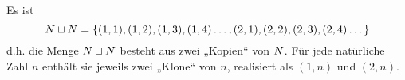 \begin{bsp}
    Es ist
        \[\relax N \sqcup\relax N=\{(1,1),(1,2),(1,3),(1,4)\dots,(2,1),(2,2),(2,3),(2,4)\dots\} \]
    d.h. die Menge $\relax N\sqcup \relax N$ besteht aus zwei „Kopien“ von $\relax N$. Für jede natürliche Zahl $n$ enthält sie jeweils zwei „Klone“ von $n$, realisiert als $(1,n)$ und $(2,n)$.
    \begin{comment}
    \begin{figure}[ht]
    \begin{tikzpicture}
        \begin{scope}[xshift=-5cm,scale=1.5]
            \draw[step=.5cm,style=help lines] (-1,-.1) grid (1.3,.1);
            \draw[->,thick] (-1,0) -- (1.5,0) node[right] {$\N$};
            \foreach \x in {1,2,3,4,5}
            \draw[xshift=.5*\x cm] (-1.5,-.1) node[below] {\x};
        \end{scope}
        \begin{scope}[scale=1.5, xshift= 0.4cm]
            \draw[style=help lines,step=.5 cm] (-1.3,-.1) grid (1.3,1.3);
            \begin{scope}
                \draw[->, thick] (-1.3,0) -- (1.5,0) node[right] {$\N$};
                \draw[thick] (-1.2,-.1) -- (-1.2,1.4) node[above] {$\{1,2\}$} coordinate(y axis);
                \foreach \x in {1,2,3,4,5}
                \draw[xshift=.5*\x cm] (-1.5,-.1) node[below] {\x};
                \foreach \y in {1,2}
                \draw[yshift=.5*\y cm] (-1.3,0) node[left] {\y};
            \end{scope}
        \end{scope}
        \begin{scope}[scale=1.5,xshift=4cm]
            \draw[style=help lines,step=.5 cm] (-1.3,-.1) grid (1.3,2.3);
            \begin{scope}
                \draw[->, thick] (-1.3,0) -- (1.5,0) node[right] {$\N$};
                \draw[->, thick] (-1.2,-.1) -- (-1.2,2.5) node[above] {$\N$} coordinate(y axis);
                \foreach \x in {1,2,3,4,5}
                \draw[xshift=.5*\x cm] (-1.5,-.1) node[below] {\x};
                \foreach \y in {1,2,3,4}
                \draw[yshift=.5*\y cm] (-1.3,0) node[left] {\y};
            \end{scope}
        \end{scope}
    \end{tikzpicture}
    \centering \caption{Vergleich von $\N\cup\N\ (=\N)$, $\N\sqcup\N$ und $\N\times\N$.}
    \end{figure}
    \end{comment}
\end{bsp}
    
